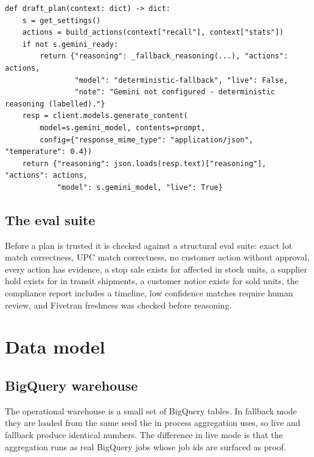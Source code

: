 \documentclass[11pt]{article}
\begin{document}
\begin{lstlisting}[style=py,caption={The reasoning call, with a fallback that never breaks the demo (backend/app/gemini.py).}]
def draft_plan(context: dict) -> dict:
    s = get_settings()
    actions = build_actions(context["recall"], context["stats"])
    if not s.gemini_ready:
        return {"reasoning": _fallback_reasoning(...), "actions": actions,
                "model": "deterministic-fallback", "live": False,
                "note": "Gemini not configured - deterministic reasoning (labelled)."}
    resp = client.models.generate_content(
        model=s.gemini_model, contents=prompt,
        config={"response_mime_type": "application/json", "temperature": 0.4})
    return {"reasoning": json.loads(resp.text)["reasoning"], "actions": actions,
            "model": s.gemini_model, "live": True}
\end{lstlisting}

\subsection{The eval suite}

Before a plan is trusted it is checked against a structural eval suite: exact lot match
correctness, UPC match correctness, no customer action without approval, every action has
evidence, a stop sale exists for affected in stock units, a supplier hold exists for in transit
shipments, a customer notice exists for sold units, the compliance report includes a timeline, low
confidence matches require human review, and Fivetran freshness was checked before reasoning.

\section{Data model}

\subsection{BigQuery warehouse}

The operational warehouse is a small set of BigQuery tables. In fallback mode they are loaded from
the same seed the in process aggregation uses, so live and fallback produce identical numbers. The
difference in live mode is that the aggregation runs as real BigQuery jobs whose job ids are
surfaced as proof.
\end{document}
